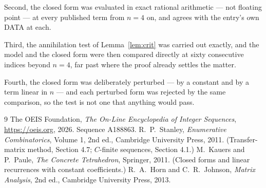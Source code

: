 \documentclass[11pt,a4paper]{article}
\theoremstyle{plain}
\theoremstyle{definition}
\begin{document}
Second, the closed form was evaluated in exact rational arithmetic --- not floating point ---
at every published term from $n=4$ on, and agrees with the entry's own DATA at each.

Third, the annihilation test of Lemma~\ref{lem:crit} was carried out exactly, and the model
and the closed form were then compared directly at sixty consecutive indices beyond
$n=4$, far past where the proof already settles the matter.

Fourth, the closed form was deliberately perturbed --- by a constant and by a term linear in
$n$ --- and each perturbed form was rejected by the same comparison, so the test is not one
that anything would pass.

\begin{thebibliography}{9}
 The OEIS Foundation, \emph{The On-Line Encyclopedia of Integer
Sequences}, \url{https://oeis.org}, 2026. Sequence A188863.
 R.~P.~Stanley, \emph{Enumerative Combinatorics}, Volume 1, 2nd ed.,
Cambridge University Press, 2011. (Transfer-matrix method, Section 4.7; $C$-finite sequences,
Section 4.1.)
 M.~Kauers and P.~Paule, \emph{The Concrete Tetrahedron}, Springer, 2011.
(Closed forms and linear recurrences with constant coefficients.)
 R.~A.~Horn and C.~R.~Johnson, \emph{Matrix Analysis}, 2nd ed., Cambridge
University Press, 2013.
\end{thebibliography}
\end{document}

